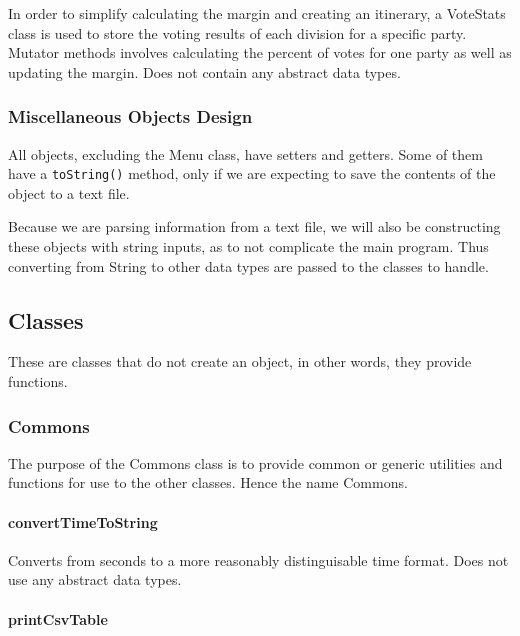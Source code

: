 \documentclass[a4paper, 12pt, titlepage]{article}
\newcommand{\code}[1]{\small\texttt{#1}\normalsize}
\begin{document}
In order to simplify calculating the margin and creating an itinerary, a
VoteStats class is used to store the voting results of each division for
a specific party. Mutator methods involves calculating the percent of votes
for one party as well as updating the margin. Does not contain any abstract
data types.

\subsubsection{Miscellaneous Objects Design}

All objects, excluding the Menu class, have setters and getters. Some of them
have a \code{toString()} method, only if we are expecting to save the contents
of the object to a text file.

Because we are parsing information from a text file, we will also be
constructing these objects with string inputs, as to not complicate
the main program. Thus converting from String to other data types are passed
to the classes to handle.

\newpage

\subsection{Classes}

These are classes that do not create an object, in other words, they provide
functions.

\subsubsection{Commons}

The purpose of the Commons class is to provide common or generic utilities
and functions for use to the other classes. Hence the name Commons.

\paragraph{convertTimeToString} \hspace{0pt}

Converts from seconds to a more reasonably distinguisable time format.
Does not use any abstract data types.

\paragraph{printCsvTable} \hspace{0pt}
\end{document}
